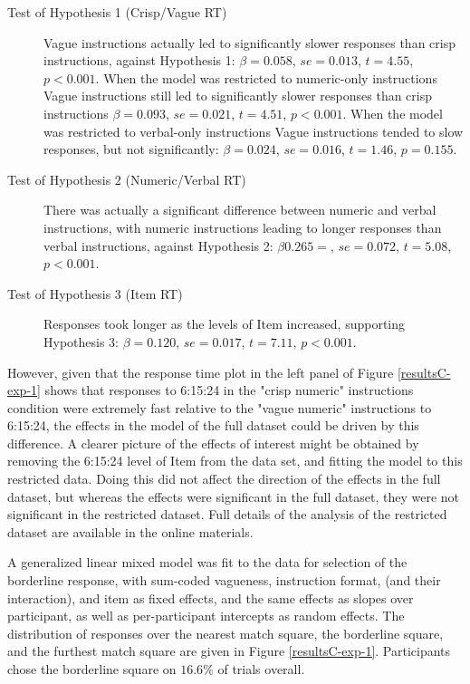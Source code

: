 \begin{description}
	\item [Test of Hypothesis 1 (Crisp/Vague RT)] Vague instructions actually led to significantly slower responses than crisp instructions, against Hypothesis 1: $\beta=0.058$, $se=0.013$, $t=4.55$, $p<0.001$. When the model was restricted to numeric-only instructions Vague instructions still led to significantly slower responses than crisp instructions $\beta=0.093$, $se=0.021$, $t=4.51$, $p<0.001$. When the model was restricted to verbal-only instructions Vague instructions tended to slow responses, but not significantly: $\beta=0.024$, $se=0.016$, $t=1.46$, $p=0.155$.
	\item [Test of Hypothesis 2 (Numeric/Verbal RT)] There was actually a significant difference between numeric and verbal instructions, with numeric instructions leading to longer responses than verbal instructions, against Hypothesis 2: $\beta0.265=$, $se=0.072$, $t=5.08$, $p<0.001$.
	\item [Test of Hypothesis 3 (Item RT)] Responses took longer as the levels of Item increased, supporting Hypothesis 3: $\beta=0.120$, $se=0.017$, $t=7.11$, $p<0.001$.
\end{description}

However, given that the response time plot in the left panel of Figure \ref{resultsC-exp-1} shows that responses to 6:15:24 in the "crisp numeric" instructions condition were extremely fast relative to the "vague numeric" instructions to 6:15:24, the effects in the model of the full dataset could be driven by this difference. A clearer picture of the effects of interest might be obtained by removing the 6:15:24 level of Item from the data set, and fitting the model to this restricted data. Doing this did not affect the direction of the effects in the full dataset, but whereas the effects were significant in the full dataset, they were not significant in the restricted dataset. Full details of the analysis of the restricted dataset are available in the online materials.

A generalized linear mixed model \citet{jaeger2008categorical} was fit to the data for selection of the borderline response, with sum-coded vagueness, instruction format, (and their interaction), and item as fixed effects, and the same effects as slopes over participant, as well as per-participant intercepts as random effects. The distribution of responses over the nearest match square, the borderline square, and the furthest match square are given in Figure \ref{resultsC-exp-1}. Participants chose the borderline square on $16.6\%$ of trials overall.

